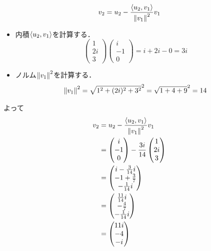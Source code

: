 \documentclass[dvipdfmx]{jsreport}
\begin{document}
\begin{souanswer}
\begin{enumerate}
\begin{equation*}
	v_2= u_2- \frac{\left\langle{u_2}, {v_1}\right\rangle}{\left\|v_1\right\|^2}v_1
\end{equation*}
\begin{itemize}
	\item 内積$\left\langle{u_2}, {v_1}\right\rangle$を計算する．
\begin{equation*}
	\begin{pmatrix}1\\ 2i\\ 3\end{pmatrix}\begin{pmatrix}i\\ -1\\ 0\end{pmatrix}= i+ 2i- 0= 3i
\end{equation*}
	\item ノルム$\left\|v_1\right\|^2$を計算する．
\begin{equation*}
	\left\|v_1\right\|^2= \sqrt{1^2+ (2i)^2+ 3^2}^2= \sqrt{1+ 4+ 9}^2= 14
\end{equation*}
\end{itemize}
	よって
\begin{align*}
	v_2
	&= u_2- \frac{\left\langle{u_2}, {v_1}\right\rangle}{\left\|v_1\right\|^2}v_1\\
	&= \begin{pmatrix}i\\ -1\\ 0\end{pmatrix}- \frac{3i}{14}\begin{pmatrix}1\\ 2i\\ 3\end{pmatrix}\\
	&= \begin{pmatrix}i- \frac{3}{14}i\\ -1+ \frac{3}{7}\\ -\frac{1}{14}i\end{pmatrix}\\
	&= \begin{pmatrix}\frac{11}{14}i\\ -\frac{4}{7}\\ -\frac{1}{14}i\end{pmatrix}\\
	&= \begin{pmatrix}11i\\ -4\\ -i\end{pmatrix}
\end{align*}
\end{enumerate}
\end{souanswer}
\end{document}
